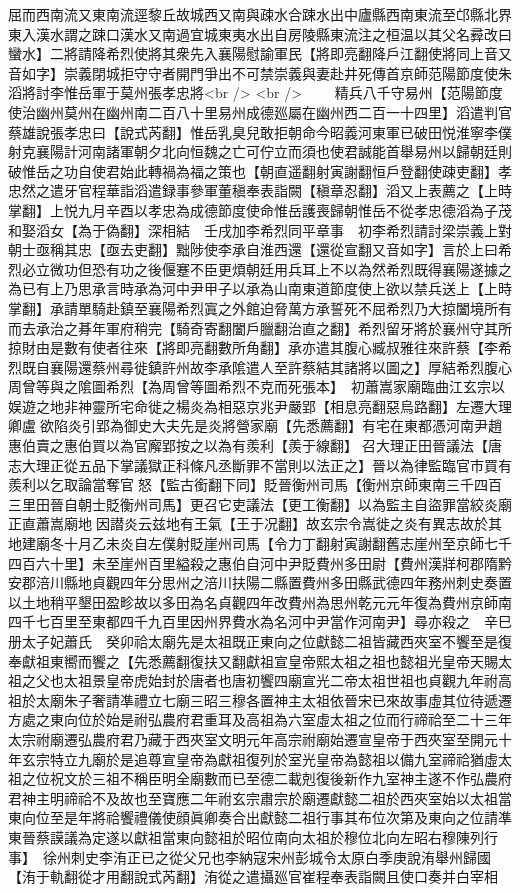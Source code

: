 屈而西南流又東南流逕黎丘故城西又南與疎水合踈水出中廬縣西南東流至邙縣北界東入漢水謂之踈口漢水又南過宜城東夷水出自房陵縣東流注之桓温以其父名彛改曰蠻水】二將請降希烈使將其衆先入襄陽慰諭軍民【將即亮翻降戶江翻使將同上音又音如字】崇義閉城拒守守者開門爭出不可禁崇義與妻赴井死傳首京師范陽節度使朱滔將討李惟岳軍于莫州張孝忠將<br />
<br />
　　精兵八千守易州【范陽節度使治幽州莫州在幽州南二百八十里易州成德廵屬在幽州西二百一十四里】滔遣判官蔡雄說張孝忠曰【說式芮翻】惟岳乳臭兒敢拒朝命今昭義河東軍已破田悦淮寧李僕射克襄陽計河南諸軍朝夕北向恒魏之亡可佇立而須也使君誠能首舉易州以歸朝廷則破惟岳之功自使君始此轉禍為福之策也【朝直遥翻射寅謝翻恒戶登翻使疎吏翻】孝忠然之遣牙官程華詣滔遣録事參軍董稹奉表詣闕【稹章忍翻】滔又上表薦之【上時掌翻】上悦九月辛酉以孝忠為成德節度使命惟岳護喪歸朝惟岳不從孝忠德滔為子茂和娶滔女【為于偽翻】深相結　壬戌加李希烈同平章事　初李希烈請討梁崇義上對朝士亟稱其忠【亟去吏翻】黜陟使李承自淮西還【還從宣翻又音如字】言於上曰希烈必立微功但恐有功之後偃蹇不臣更煩朝廷用兵耳上不以為然希烈既得襄陽遂據之為已有上乃思承言時承為河中尹甲子以承為山南東道節度使上欲以禁兵送上【上時掌翻】承請單騎赴鎮至襄陽希烈寘之外館迫脅萬方承誓死不屈希烈乃大掠闔境所有而去承治之朞年軍府稍完【騎奇寄翻闔戶臘翻治直之翻】希烈留牙將於襄州守其所掠財由是數有使者往來【將即亮翻數所角翻】承亦遣其腹心臧叔雅往來許蔡【李希烈既自襄陽還蔡州尋徙鎮許州故李承隂遣人至許蔡結其諸將以圖之】厚結希烈腹心周曾等與之隂圖希烈【為周曾等圖希烈不克而死張本】　初蕭嵩家廟臨曲江玄宗以娱遊之地非神靈所宅命徙之楊炎為相惡京兆尹嚴郢【相息亮翻惡烏路翻】左遷大理卿盧欲陷炎引郢為御史大夫先是炎將營家廟【先悉薦翻】有宅在東都憑河南尹趙惠伯賣之惠伯買以為官廨郢按之以為有羨利【羨于線翻】召大理正田晉議法【唐志大理正從五品下掌議獄正科條凡丞斷罪不當則以法正之】晉以為律監臨官市買有羨利以乞取論當奪官怒【監古銜翻下同】貶晉衡州司馬【衡州京師東南三千四百三里田晉自朝士貶衡州司馬】更召它吏議法【更工衡翻】以為監主自盜罪當絞炎廟正直蕭嵩廟地因譛炎云兹地有王氣【王于况翻】故玄宗令嵩徙之炎有異志故於其地建廟冬十月乙未炎自左僕射貶崖州司馬【令力丁翻射寅謝翻舊志崖州至京師七千四百六十里】未至崖州百里縊殺之惠伯自河中尹貶費州多田尉【費州漢牂柯郡隋黔安郡涪川縣地貞觀四年分思州之涪川扶陽二縣置費州多田縣武德四年務州刺史奏置以土地稍平墾田盈畛故以多田為名貞觀四年改費州為思州乾元元年復為費州京師南四千七百里至東都四千九百里因州界費水為名河中尹當作河南尹】尋亦殺之　辛巳册太子妃蕭氏　癸卯祫太廟先是太祖既正東向之位獻懿二祖皆藏西夾室不饗至是復奉獻祖東嚮而饗之【先悉薦翻復扶又翻獻祖宣皇帝熙太祖之祖也懿祖光皇帝天賜太祖之父也太祖景皇帝虎始封於唐者也唐初饗四廟宣光二帝太祖世祖也貞觀九年祔高祖於太廟朱子奢請凖禮立七廟三昭三穆各置神主太祖依晉宋已來故事虛其位待遞遷方處之東向位於始是祔弘農府君重耳及高祖為六室虛太祖之位而行禘祫至二十三年太宗祔廟遷弘農府君乃藏于西夾室文明元年高宗祔廟始遷宣皇帝于西夾室至開元十年玄宗特立九廟於是追尊宣皇帝為獻祖復列於室光皇帝為懿祖以備九室禘祫猶虛太祖之位祝文於三祖不稱臣明全廟數而已至德二載剋復後新作九室神主遂不作弘農府君神主明禘祫不及故也至寶應二年祔玄宗肅宗於廟遷獻懿二祖於西夾室始以太祖當東向位至是年將祫饗禮儀使顔眞卿奏合出獻懿二祖行事其布位次第及東向之位請凖東晉蔡謨議為定遂以獻祖當東向懿祖於昭位南向太祖於穆位北向左昭右穆陳列行事】　徐州刺史李洧正已之從父兄也李納寇宋州彭城令太原白季庚說洧舉州歸國【洧于軌翻從才用翻說式芮翻】洧從之遣攝廵官崔程奉表詣闕且使口奏并白宰相